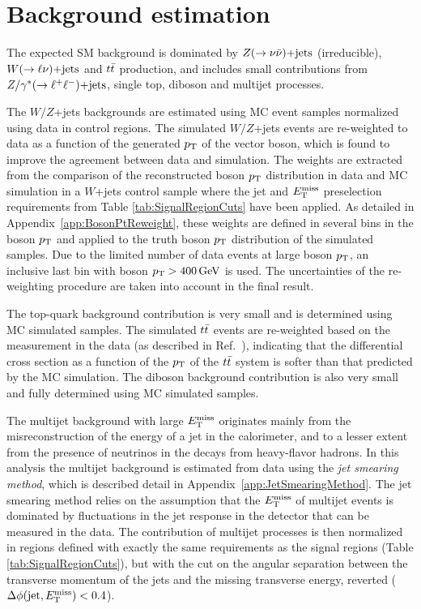 \section{Background estimation}
    \label{sec:BkgEstimation}

The expected SM background is dominated by $Z(\rightarrow \nu \bar{\nu})\text{+jets}$ (irreducible), $W(\rightarrow \ell \nu)\text{+jets}$ and $t\bar{t}$ production, and includes small contributions from $Z/\gamma^{*}(\rightarrow \ell^{+} \ell^{-})\text{+jets}$, single top, diboson and multijet processes.

The $W/Z$+jets backgrounds are estimated using MC event samples normalized using data in control regions.
The simulated $W/Z$+jets events are re-weighted to data as a function of the generated $p_{\mathrm{T}}$ of the vector boson, which is found to improve the agreement between data and simulation.
The weights are extracted from the comparison of the reconstructed boson $p_{\mathrm{T}}$ distribution in data and {\sherpa} MC simulation in a $W$+jets control sample where the jet and $E_{\mathrm{T}}^{\mathrm{miss}}$ preselection requirements from Table \ref{tab:SignalRegionCuts} have been applied.
As detailed in Appendix~\ref{app:BosonPtReweight}, these weights are defined in several bins in the boson $p_{\mathrm{T}}$ and applied to the truth boson $p_{\mathrm{T}}$ distribution of the simulated samples.
Due to the limited number of data events at large boson $p_{\mathrm{T}}$, an inclusive last bin with boson $\pt > \unit[400]{GeV}$ is used.
The uncertainties of the re-weighting procedure are taken into account in the final result.

The top-quark background contribution is very small and is determined using MC simulated samples.
The simulated $t\bar{t}$ events are re-weighted based on the measurement in the data (as described in Ref.~\cite{Aad:2012hg}), indicating that the differential cross section as a function of the $p_{\mathrm{T}}$ of the $t\bar{t}$ system is softer than that predicted by the MC simulation.
The diboson background contribution is also very small and fully determined using MC simulated samples.

The multijet background with large $E_{\mathrm{T}}^{\mathrm{miss}}$ originates mainly from the misreconstruction of the energy of a jet in the calorimeter, and to a lesser extent from the presence of neutrinos in the decays from heavy-flavor hadrons.
In this analysis the multijet background is estimated from data using the {\em jet smearing method}, which is described detail in Appendix~\ref{app:JetSmearingMethod}.
The jet smearing method relies on the assumption that the $E_{\mathrm{T}}^{\mathrm{miss}}$ of multijet events is dominated by fluctuations in the jet response in the detector that can be measured in the data.
The contribution of multijet processes is then normalized in regions defined with exactly the same requirements as the signal regions (Table \ref{tab:SignalRegionCuts}), but with the cut on the angular separation between the transverse momentum of the jets and the missing transverse energy, reverted ($\Delta\phi(\text{jet}, \met) < 0.4$).


